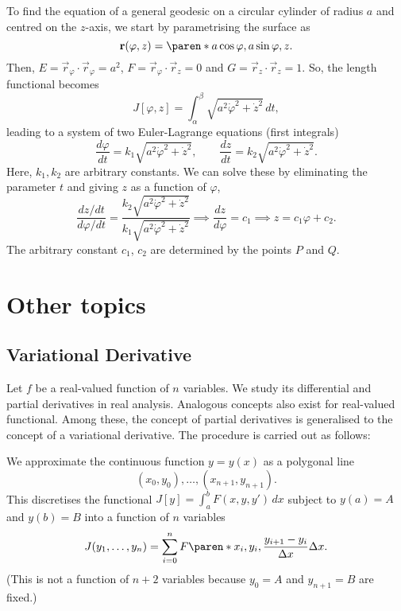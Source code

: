\documentclass[11pt]{penrose}
\begin{document}
\begin{negg}
    To find the equation of a general geodesic on a circular cylinder of radius $a$ and centred on the $z$-axis, we start by parametrising the surface as
    \begin{equation}
        \vec{r}(\varphi, z) = \paren*{a\cos\varphi, a\sin\varphi, z}.
    \end{equation}
    Then, $E = \vec{r}_\varphi \cdot \vec{r}_\varphi = a^2$, $F = \vec{r}_\varphi \cdot \vec{r}_z = 0$ and $G = \vec{r}_z \cdot \vec{r}_z = 1$. So, the length functional becomes
    \begin{equation}
        J[\varphi, z] = \int_\alpha^\beta \sqrt{a^2 \dot{\varphi}^2 + \dot{z}^2} \,dt,
    \end{equation}
    leading to a system of two Euler-Lagrange equations (first integrals)
    \begin{equation}
        \frac{d\varphi}{dt} = k_1 \sqrt{a^2 \dot{\varphi}^2 + \dot{z}^2},
        \qquad
        \frac{dz}{dt} = k_2 \sqrt{a^2 \dot{\varphi}^2 + \dot{z}^2}.
    \end{equation}
    Here, $k_1, k_2$ are arbitrary constants. We can solve these by eliminating the parameter $t$ and giving $z$ as a function of $\varphi$,
    \begin{equation}
        \frac{dz/dt}{d\varphi/dt}
        = \frac{k_2 \sqrt{a^2 \dot{\varphi}^2 + \dot{z}^2}}{k_1 \sqrt{a^2 \dot{\varphi}^2 + \dot{z}^2}}
        \implies
        \frac{dz}{d\varphi} = c_1
        \implies
        z = c_1 \varphi + c_2.
    \end{equation}
    The arbitrary constant $c_1$, $c_2$ are determined by the points $P$ and $Q$.
\end{negg}

\section{Other topics}
\subsection{Variational Derivative}
Let $f$ be a real-valued function of $n$ variables. We study its differential and partial derivatives in real analysis. Analogous concepts also exist for real-valued functional. Among these, the concept of partial derivatives is generalised to the concept of a variational derivative. The procedure is carried out as follows:

We approximate the continuous function $y = y(x)$ as a polygonal line
\begin{equation}
    (x_0, y_0), \dots, (x_{n+1}, y_{n+1}).
\end{equation}
This discretises the functional $J[y] = \int_a^b F(x, y, y') \,dx$ subject to $y(a) = A$ and $y(b) = B$ into a function of $n$ variables
\begin{equation}
    J(y_1, \dots, y_n)
    = \sum_{i=0}^{n} F \paren*{x_i, y_i, \frac{y_{i+1} - y_i}{\Delta x}} \Delta x.
\end{equation}
(This is not a function of $n+2$ variables because $y_0 = A$ and $y_{n+1} = B$ are fixed.)
\end{document}

